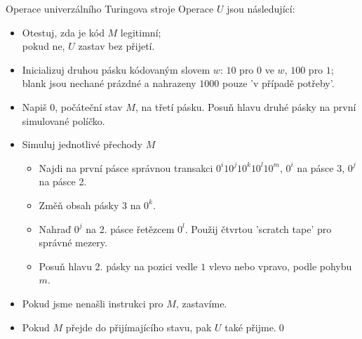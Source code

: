     \begin{frame}{Operace univerzálního Turingova stroje}
    Operace $U$ jsou následující:
    \begin{itemize}[<+->]
        \item Otestuj, zda je kód $M$ legitimní;\\ pokud ne, $U$ zastav bez přijetí.
        \item Inicializuj druhou pásku kódovaným slovem $w$: $10$ pro $0$ ve $w$, $100$ pro $1$; blank jsou nechané prázdné a nahrazeny $1000$ pouze 'v případě potřeby'.
        \item Napiš $0$, počáteční stav $M$, na třetí pásku. Posuň hlavu druhé pásky na první simulované políčko.
        \item Simuluj jednotlivé přechody $M$
        \begin{itemize}
            \item Najdi na první pásce správnou transakci $0^i10^j10^k10^l10^m$, $0^i$ na pásce 3, $0^j$ na pásce 2.
            \item Změň obsah pásky 3 na $0^k$.
            \item Nahraď $0^j$ na 2. pásce řetězcem $0^l$. Použij čtvrtou 'scratch tape' pro správné mezery.
            \item Posuň hlavu 2. pásky na pozici vedle $1$ vlevo nebo vpravo, podle pohybu $m$.
        \end{itemize}
            \item Pokud jsme nenašli instrukci pro $M$, zastavíme.
            \item Pokud $M$ přejde do přijímajícího stavu, pak  $U$ také přijme.\qed
    \end{itemize}
    \end{frame}
    
